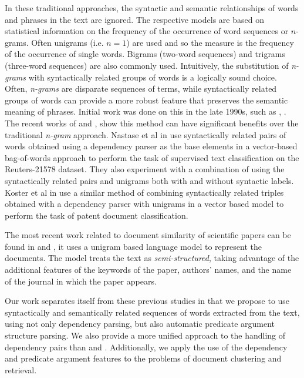 \documentclass[11pt]{article}
\begin{document}
In these traditional approaches, the syntactic and semantic relationships of words and phrases in the text are ignored. The respective models are based on statistical information on the frequency of the occurrence of word sequences or $n$-grams. Often unigrams (i.e. $n=1$) are used and so the measure is the frequency of the occurrence of single words. Bigrams (two-word sequences) and trigrams (three-word sequences) are also commonly used. Intuitively, the substitution of \emph{n-grams} with syntactically related groups of words is a logically sound choice. Often, \emph{n-grams} are disparate sequences of terms, while syntactically related groups of words can provide a more robust feature that preserves the semantic meaning of phrases. Initial work was done on this in the late 1990s, such as \cite{Furnkranz1998}, \cite{Dumais1998}. The recent works of \cite{Nastase2007} and \cite{Koster2009}, show this method can have significant benefits over the traditional \emph{n-gram} approach. Nastase et al in \cite{Nastase2007} use syntactically related pairs of words obtained using a dependency parser as the base elements in a vector-based bag-of-words approach to perform the task of supervised text classification on the Reuters-21578 dataset. They also experiment with a combination of using the syntactically related pairs and unigrams both with and without syntactic labels. Koster et al in \cite{Koster2009} use a similar method of combining syntactically related triples obtained with a dependency parser with unigrams in a vector based model to perform the task of patent document classification.

The most recent work related to document similarity of scientific papers can be found in \cite{Hurtado2011} and \cite{Hurtado2013}, it uses a unigram based language model to represent the documents. The model treats the text as \emph{semi-structured}, taking advantage of the additional features of the keywords of the paper, authors' names, and the name of the journal in which the paper appears.

Our work separates itself from these previous studies in that we propose to use syntactically and semantically related sequences of words extracted from the text, using not only dependency parsing, but also automatic predicate argument structure parsing. We also provide a more unified approach to the handling of dependency pairs than \cite{Nastase2007} and \cite{Koster2009}. Additionally, we apply the use of the dependency and predicate argument features to the problems of document clustering and retrieval. 
\end{document}
